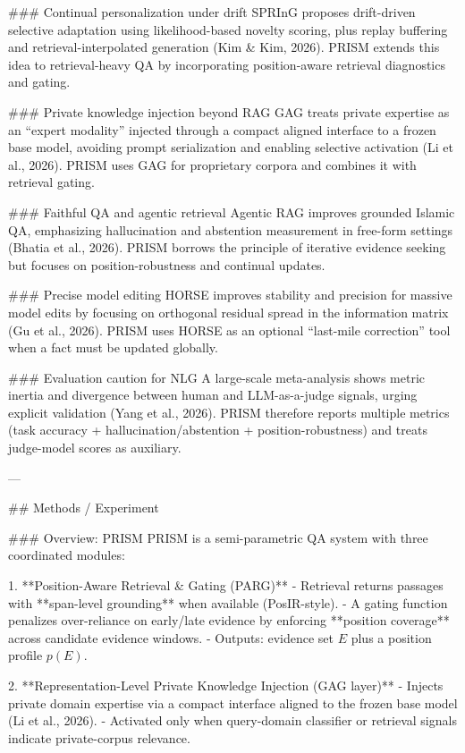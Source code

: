 ### Continual personalization under drift  
SPRInG proposes drift-driven selective adaptation using likelihood-based novelty scoring, plus replay buffering and retrieval-interpolated generation (Kim & Kim, 2026). PRISM extends this idea to retrieval-heavy QA by incorporating position-aware retrieval diagnostics and gating.

### Private knowledge injection beyond RAG  
GAG treats private expertise as an “expert modality” injected through a compact aligned interface to a frozen base model, avoiding prompt serialization and enabling selective activation (Li et al., 2026). PRISM uses GAG for proprietary corpora and combines it with retrieval gating.

### Faithful QA and agentic retrieval  
Agentic RAG improves grounded Islamic QA, emphasizing hallucination and abstention measurement in free-form settings (Bhatia et al., 2026). PRISM borrows the principle of iterative evidence seeking but focuses on position-robustness and continual updates.

### Precise model editing  
HORSE improves stability and precision for massive model edits by focusing on orthogonal residual spread in the information matrix (Gu et al., 2026). PRISM uses HORSE as an optional “last-mile correction” tool when a fact must be updated globally.

### Evaluation caution for NLG  
A large-scale meta-analysis shows metric inertia and divergence between human and LLM-as-a-judge signals, urging explicit validation (Yang et al., 2026). PRISM therefore reports multiple metrics (task accuracy + hallucination/abstention + position-robustness) and treats judge-model scores as auxiliary.

---

## Methods / Experiment  

### Overview: PRISM  
PRISM is a semi-parametric QA system with three coordinated modules:

1. **Position-Aware Retrieval & Gating (PARG)**  
   - Retrieval returns passages with **span-level grounding** when available (PosIR-style).  
   - A gating function penalizes over-reliance on early/late evidence by enforcing **position coverage** across candidate evidence windows.  
   - Outputs: evidence set \(E\) plus a position profile \(p(E)\).

2. **Representation-Level Private Knowledge Injection (GAG layer)**  
   - Injects private domain expertise via a compact interface aligned to the frozen base model (Li et al., 2026).  
   - Activated only when query-domain classifier or retrieval signals indicate private-corpus relevance.

